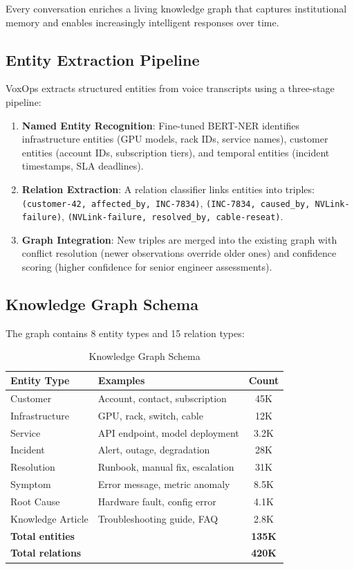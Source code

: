 \documentclass[conference,10pt]{IEEEtran}
\begin{document}
Every conversation enriches a living knowledge graph that captures institutional memory and enables increasingly intelligent responses over time.

\subsection{Entity Extraction Pipeline}

VoxOps extracts structured entities from voice transcripts using a three-stage pipeline:

\begin{enumerate}
\item \textbf{Named Entity Recognition}: Fine-tuned BERT-NER identifies infrastructure entities (GPU models, rack IDs, service names), customer entities (account IDs, subscription tiers), and temporal entities (incident timestamps, SLA deadlines).
\item \textbf{Relation Extraction}: A relation classifier links entities into triples: \texttt{(customer-42, affected\_by, INC-7834)}, \texttt{(INC-7834, caused\_by, NVLink-failure)}, \texttt{(NVLink-failure, resolved\_by, cable-reseat)}.
\item \textbf{Graph Integration}: New triples are merged into the existing graph with conflict resolution (newer observations override older ones) and confidence scoring (higher confidence for senior engineer assessments).
\end{enumerate}

\subsection{Knowledge Graph Schema}

The graph contains 8 entity types and 15 relation types:

\begin{table}[!htbp]
\caption{Knowledge Graph Schema}
\label{tab:kgschema}
\centering\scriptsize
\begin{tabular}{@{}llc@{}}
\toprule
\textbf{Entity Type} & \textbf{Examples} & \textbf{Count} \\
\midrule
Customer & Account, contact, subscription & 45K \\
Infrastructure & GPU, rack, switch, cable & 12K \\
Service & API endpoint, model deployment & 3.2K \\
Incident & Alert, outage, degradation & 28K \\
Resolution & Runbook, manual fix, escalation & 31K \\
Symptom & Error message, metric anomaly & 8.5K \\
Root Cause & Hardware fault, config error & 4.1K \\
Knowledge Article & Troubleshooting guide, FAQ & 2.8K \\
\midrule
\textbf{Total entities} & & \textbf{135K} \\
\textbf{Total relations} & & \textbf{420K} \\
\bottomrule
\end{tabular}
\end{table}
\end{document}
